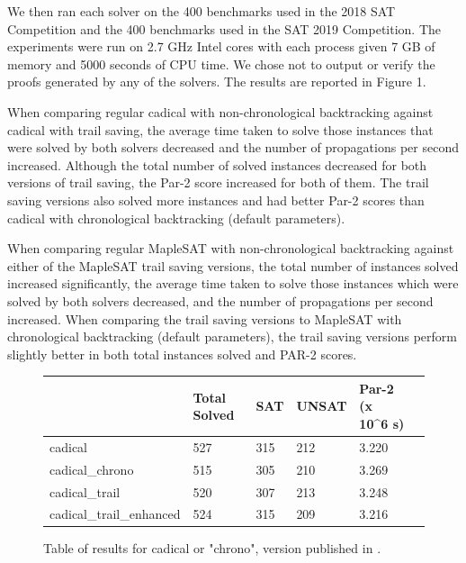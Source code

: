\documentclass[runningheads]{llncs}
\begin{document}
We then ran each solver on the 400 benchmarks used in the 2018 SAT
Competition and the 400 benchmarks used in the SAT 2019
Competition. The experiments were run on 2.7 GHz Intel cores with each
process given 7 GB of memory and 5000 seconds of CPU time. We chose
not to output or verify the proofs generated by any of the
solvers. The results are reported in Figure 1.

When comparing regular cadical with non-chronological backtracking
against cadical with trail saving, the average time taken to solve
those instances that were solved by both solvers decreased and the
number of propagations per second increased. Although the total number
of solved instances decreased for both versions of trail saving, the
Par-2 score increased for both of them. The trail saving versions also
solved more instances and had better Par-2 scores than cadical with
chronological backtracking (default parameters).

When comparing regular MapleSAT with non-chronological backtracking
against either of the MapleSAT trail saving versions, the total number
of instances solved increased significantly, the average time taken to
solve those instances which were solved by both solvers decreased, and
the number of propagations per second increased. When comparing the
trail saving versions to MapleSAT with chronological backtracking
(default parameters), the trail saving versions perform slightly
better in both total instances solved and PAR-2 scores.

\begin{figure}
    \begin{tabular}{|l|l|l|l|l|l|}
      \hline
      & Total Solved & SAT & UNSAT & Par-2 (x 10\textasciicircum{}6 s) \\ \hline
      cadical                  & 527          & 315 &  212  & 3.220                             \\ \hline
      cadical\_chrono          & 515          & 305 &  210  & 3.269                             \\ \hline
      cadical\_trail           & 520          & 307 &  213  & 3.248                             \\ \hline
      cadical\_trail\_enhanced & 524          & 315 &  209  & 3.216                             \\ \hline
    \end{tabular}
    \caption{Table of results for cadical or "chrono", version published in \cite{DBLP:conf/sat/MohleB19}.}
\end{figure}
\end{document}
